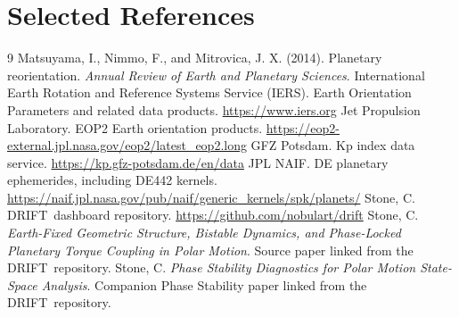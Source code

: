 \documentclass[11pt]{article}
\newcommand{\DRIFT}{\textsc{DRIFT}}
\begin{document}
\section{Selected References}
\begin{thebibliography}{9}
 Matsuyama, I., Nimmo, F., and Mitrovica, J. X. (2014). Planetary reorientation. \emph{Annual Review of Earth and Planetary Sciences}.
 International Earth Rotation and Reference Systems Service (IERS). Earth Orientation Parameters and related data products. \url{https://www.iers.org}
 Jet Propulsion Laboratory. EOP2 Earth orientation products. \url{https://eop2-external.jpl.nasa.gov/eop2/latest_eop2.long}
 GFZ Potsdam. Kp index data service. \url{https://kp.gfz-potsdam.de/en/data}
 JPL NAIF. DE planetary ephemerides, including DE442 kernels. \url{https://naif.jpl.nasa.gov/pub/naif/generic_kernels/spk/planets/}
 Stone, C. \DRIFT\ dashboard repository. \url{https://github.com/nobulart/drift}
 Stone, C. \emph{Earth-Fixed Geometric Structure, Bistable Dynamics, and Phase-Locked Planetary Torque Coupling in Polar Motion}. Source paper linked from the \DRIFT\ repository.
 Stone, C. \emph{Phase Stability Diagnostics for Polar Motion State-Space Analysis}. Companion Phase Stability paper linked from the \DRIFT\ repository.
\end{thebibliography}
\end{document}
